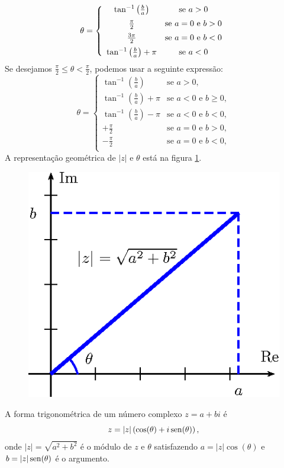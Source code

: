 $$
\theta=\left\{\begin{array}{cc}\tan^{-1}\left(\frac{b}{a}\right)&\hbox{se}\ a>0\\[5pt]
\frac{\pi}{2}&\hbox{se}\ a=0\ \hbox{e}\ b>0\\[5pt]
\frac{3\pi}{2}&\hbox{se}\ a=0\ \hbox{e}\ b<0 \\[5pt] 
\tan^{-1}\left(\frac{b}{a}\right)+\pi&\hbox{se}\ a<0\end{array}\right.
$$
Se desejamos $\frac{\pi}{2}\leq \theta < \frac{\pi}{2}$, podemos usar a seguinte expressão:
$$\theta=\begin{cases}
\tan^{-1}(\frac b a) &\text{se } a > 0, \\[5pt]
\tan^{-1}(\frac b a) + \pi &\text{se } a < 0 \text{ e } b \ge 0, \\[5pt]
\tan^{-1}(\frac b a) - \pi &\text{se } a < 0 \text{ e } b < 0, \\[5pt]
+\frac{\pi}{2} &\text{se } a = 0 \text{ e } b > 0, \\[5pt]
-\frac{\pi}{2} &\text{se } a = 0 \text{ e } b < 0, \\[5pt]
\end{cases}$$
A representação geométrica de $|z|$ e $\theta$ está na figura \ref{num_complexo}.
\begin{figure}[!ht]
\begin{center}

\includegraphics{cap_num_complexos/pics/figura_1}\end{center}
\caption{\label{num_complexo}}
\end{figure}
\begin{defn}A forma trigonométrica de um número complexo $z=a+bi$ é 
$$
z=|z|\left(\cos(\theta)+i\operatorname{sen}(\theta)\right),
$$
onde $|z|=\sqrt{a^2+b^2}$ é o módulo de $z$ e $\theta$ satisfazendo $a=|z|\cos(\theta)$ e $b=|z|\operatorname{sen}(\theta)$ é o argumento.
\end{defn}
